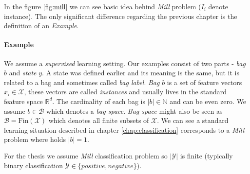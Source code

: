 In the figure \ref{fig:mill} we can see basic idea behind \emph{Mill} problem ($I_i$ denote instance). The only significant difference regarding the previous chapter is the definition of an \emph{Example}. 
\paragraph{Example}
We assume a \emph{supervised} learning setting. Our examples consist of two parts - \emph{bag} $b$ and \emph{state} $y$. A state was defined earlier and its meaning is the same, but it is related to a bag and sometimes called \emph{bag label}. \emph{Bag} $b$ is a set of feature vectors $x_i\in\mathcal{X}$, these vectors are called \emph{instances} and usually lives in the standard feature space $\mathbb{R}^{d}$. The cardinality of each bag is $|b| \in \mathbb{N}$ and can be even zero. We assume $b \in \mathcal{B}$ which denotes a \emph{bag space}. \emph{Bag space} might also be seen as $\mathcal{B} = \mathrm{Fin}(\mathcal{X})$ which denotes all finite subsets of $\mathcal{X}$. We can see a standard learning situation described in chapter \ref{chap:classification} corresponds to a \emph{Mill} problem where holds $|b| = 1$.

For the thesis we assume \emph{Mill} classification problem so $|\mathcal{Y}|$ is finite (typically binary classification $\mathcal{Y} \in \{positive, negative\}$). 

